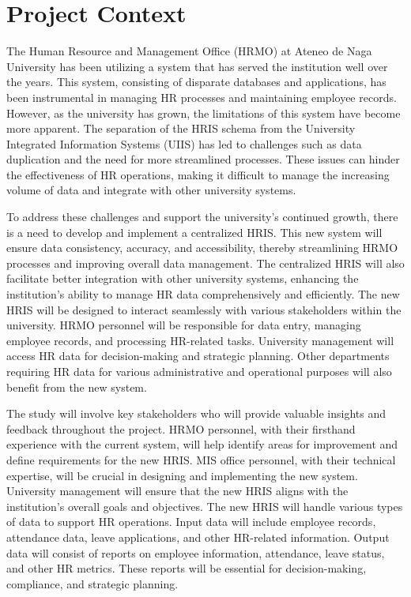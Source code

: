 \section{Project Context}
    
    The Human Resource and Management Office (HRMO) at Ateneo de Naga University has been utilizing a system that has served the institution well over the years. This system, consisting of disparate databases and applications, has been instrumental in managing HR processes and maintaining employee records. However, as the university has grown, the limitations of this system have become more apparent. The separation of the HRIS schema from the University Integrated Information Systems (UIIS) has led to challenges such as data duplication and the need for more streamlined processes. These issues can hinder the effectiveness of HR operations, making it difficult to manage the increasing volume of data and integrate with other university systems.
    
    To address these challenges and support the university's continued growth, there is a need to develop and implement a centralized HRIS. This new system will ensure data consistency, accuracy, and accessibility, thereby streamlining HRMO processes and improving overall data management. The centralized HRIS will also facilitate better integration with other university systems, enhancing the institution's ability to manage HR data comprehensively and efficiently. The new HRIS will be designed to interact seamlessly with various stakeholders within the university. HRMO personnel will be responsible for data entry, managing employee records, and processing HR-related tasks. University management will access HR data for decision-making and strategic planning. Other departments requiring HR data for various administrative and operational purposes will also benefit from the new system.

    The study will involve key stakeholders who will provide valuable insights and feedback throughout the project. HRMO personnel, with their firsthand experience with the current system, will help identify areas for improvement and define requirements for the new HRIS. MIS office personnel, with their technical expertise, will be crucial in designing and implementing the new system. University management will ensure that the new HRIS aligns with the institution's overall goals and objectives. The new HRIS will handle various types of data to support HR operations. Input data will include employee records, attendance data, leave applications, and other HR-related information. Output data will consist of reports on employee information, attendance, leave status, and other HR metrics. These reports will be essential for decision-making, compliance, and strategic planning.
    
